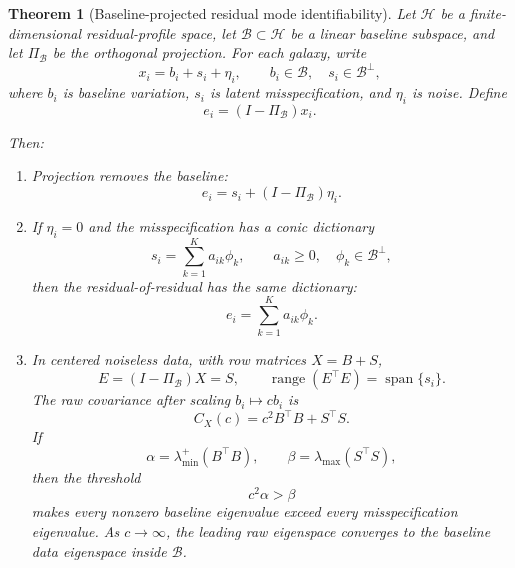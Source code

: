 \documentclass[10pt,twocolumn]{article}
\newcommand{\proj}{\Pi}
\newtheorem{theorem}{Theorem}
\begin{document}
\begin{theorem}[Baseline-projected residual mode identifiability]
Let $\mathcal H$ be a finite-dimensional residual-profile space, let
$\mathcal B\subset\mathcal H$ be a linear baseline subspace, and let
$\proj_{\mathcal B}$ be the orthogonal projection. For each galaxy, write
\begin{equation}
x_i=b_i+s_i+\eta_i,
\qquad
b_i\in\mathcal B,\quad s_i\in\mathcal B^\perp ,
\end{equation}
where $b_i$ is baseline variation, $s_i$ is latent misspecification, and
$\eta_i$ is noise. Define
\begin{equation}
e_i=(I-\proj_{\mathcal B})x_i .
\end{equation}

Then:
\begin{enumerate}
\item Projection removes the baseline:
\begin{equation}
e_i=s_i+(I-\proj_{\mathcal B})\eta_i .
\end{equation}
\item If $\eta_i=0$ and the misspecification has a conic dictionary
\begin{equation}
s_i=\sum_{k=1}^K a_{ik}\phi_k,
\qquad
a_{ik}\ge0,\quad \phi_k\in\mathcal B^\perp ,
\end{equation}
then the residual-of-residual has the same dictionary:
\begin{equation}
e_i=\sum_{k=1}^K a_{ik}\phi_k .
\end{equation}
\item In centered noiseless data, with row matrices $X=B+S$,
\begin{equation}
E=(I-\proj_{\mathcal B})X=S,
\qquad
\operatorname{range}(E^\top E)=\operatorname{span}\{s_i\}.
\end{equation}
The raw covariance after scaling $b_i\mapsto c b_i$ is
\begin{equation}
C_X(c)=c^2B^\top B+S^\top S .
\end{equation}
If
\begin{equation}
\alpha=\lambda_{\min}^+(B^\top B),
\qquad
\beta=\lambda_{\max}(S^\top S),
\end{equation}
then the threshold
\begin{equation}
c^2\alpha>\beta
\end{equation}
makes every nonzero baseline eigenvalue exceed every misspecification
eigenvalue. As $c\to\infty$, the leading raw eigenspace converges to the
baseline data eigenspace inside $\mathcal B$.
\end{enumerate}
\end{theorem}
\end{document}

